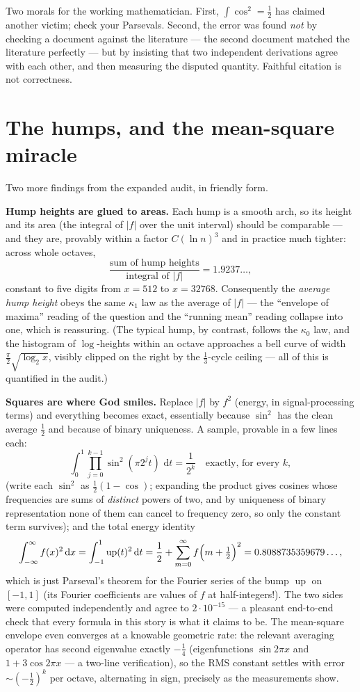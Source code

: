 \documentclass[11pt,oneside]{article}
\theoremstyle{remark}
\newcommand{\dd}{\,\mathrm d}
\newcommand{\Up}{\operatorname{up}}
\begin{document}
Two morals for the working mathematician.  First,
$\int\cos^2=\tfrac12$ has claimed another victim; check your
Parsevals.  Second, the error was found \emph{not} by checking a
document against the literature --- the second document matched the
literature perfectly --- but by insisting that two independent
derivations agree with each other, and then measuring the disputed
quantity.  Faithful citation is not correctness.

\section{The humps, and the mean-square miracle}
\label{sec:rms}

Two more findings from the expanded audit, in friendly form.

\textbf{Hump heights are glued to areas.}  Each hump is a smooth arch,
so its height and its area (the integral of $|f|$ over the unit
interval) should be comparable --- and they are, provably within a
factor $C(\ln n)^3$ and in practice much tighter: across whole
octaves,
\[
 \frac{\text{sum of hump heights}}{\text{integral of }|f|}
 =1.9237\ldots,
\]
constant to five digits from $x=512$ to $x=32768$.  Consequently the
\emph{average hump height} obeys the same $\kappa_1$ law as the
average of $|f|$ --- the ``envelope of maxima'' reading of the
question and the ``running mean'' reading collapse into one, which is
reassuring.  (The typical hump, by contrast, follows the
$\kappa_0$ law, and the histogram of $\log$-heights within an octave
approaches a bell curve of width $\tfrac\pi2\sqrt{\log_2x}$, visibly
clipped on the right by the $\tfrac13$-cycle ceiling --- all of this
is quantified in the audit.)

\textbf{Squares are where God smiles.}  Replace $|f|$ by $f^2$
(energy, in signal-processing terms) and everything becomes exact,
essentially because $\sin^2$ has the clean average $\tfrac12$ and
because of binary uniqueness.  A sample, provable in a few lines
each:
\[
 \int_0^1\prod_{j=0}^{k-1}\sin^2(\pi2^jt)\,\dd t=\frac{1}{2^k}
 \quad\text{exactly, for every }k,
\]
(write each $\sin^2$ as $\tfrac12(1-\cos)$; expanding the product
gives cosines whose frequencies are sums of \emph{distinct} powers of
two, and by uniqueness of binary representation none of them can
cancel to frequency zero, so only the constant term survives);
and the total energy identity
\[
 \int_{-\infty}^{\infty}f(x)^2\dd x
 =\int_{-1}^{1}\Up(t)^2\dd t
 =\frac12+\sum_{m=0}^{\infty}f\Bigl(m+\tfrac12\Bigr)^{2}
 =0.8088735359679\ldots,
\]
which is just Parseval's theorem for the Fourier series of the bump
$\Up$ on $[-1,1]$ (its Fourier coefficients are values of $f$ at
half-integers!).  The two sides were computed independently and agree
to $2\cdot10^{-15}$ --- a pleasant end-to-end check that every formula
in this story is what it claims to be.  The mean-square envelope even
converges at a knowable geometric rate: the relevant averaging
operator has second eigenvalue exactly $-\tfrac14$ (eigenfunctions
$\sin2\pi x$ and $1+3\cos2\pi x$ --- a two-line verification), so the
RMS constant settles with error $\sim(-\tfrac12)^k$ per octave,
alternating in sign, precisely as the measurements show.
\end{document}
